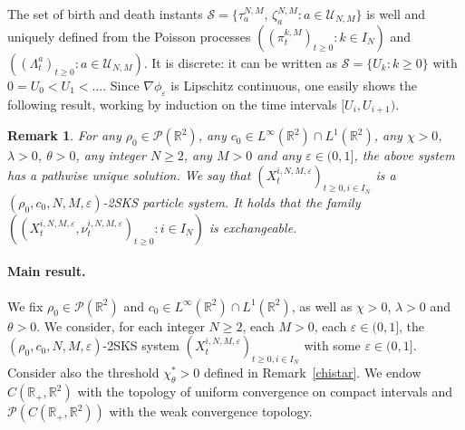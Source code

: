 \documentclass[11pt]{article}
\newtheorem{remark}[theorem]{Remark}
\newcommand{\R}{\mathbb{R}}
\newcommand{\1}{\mathbbm{1}}
\newcommand{\Ss}{\mathcal S}
\newcommand{\Pp}{\mathcal P}
\newcommand{\Uu}{\mathcal U}
\newcommand{\e}{\varepsilon}
\begin{document}
The set of birth and death instants $\Ss=\{\tau_a^{N,M}$, $\zeta_a^{N,M} : a \in \Uu_{N,M}\}$
is well and uniquely defined from the Poisson processes
$((\pi^{k,M}_t)_{t\geq 0} : k\in I_N)$ and $((\Lambda^a_t)_{t \geq 0}:a\in \Uu_{N,M})$. 
It is discrete: it can be written as $\Ss=\{U_k : k\geq 0\}$ with 
$0=U_0<U_1<\dots$. Since $\nabla \phi_\e$ is Lipschitz continuous, one easily
shows the following result, working by induction on the time intervals $[U_i,U_{i+1})$.

\begin{remark}\label{rkeu}
For any  $\rho_0 \in \Pp(\R^2)$, any $c_0 \in L^\infty(\R^2)\cap L^1(\R^2)$, any $\chi>0$, $\lambda>0$, 
$\theta>0$, any integer $N\geq 2$, any $M>0$ and any $\e\in (0,1]$,
the above system has a pathwise unique solution. We say that
$(X^{i,N,M,\e}_t)_{t\geq 0,i\in I_N}$ is a $(\rho_0,c_0,N,M,\e)$-2SKS particle system.
It holds that the family $((X^{i,N,M,\e}_t,\nu^{i,N,M,\e}_t)_{t\geq 0} : i \in I_N)$ is exchangeable.
\end{remark}


\paragraph{Main result.}

We fix $\rho_0 \in \Pp(\R^2)$ and $c_0 \in L^\infty(\R^2)\cap L^1(\R^2)$,
as well as $\chi>0$, $\lambda>0$ and $\theta>0$. We 
consider, for each integer $N\geq 2$, each $M>0$, each $\e\in (0,1]$, the  $(\rho_0,c_0,N,M,\e)$-2SKS system
$(X^{i,N,M,\e}_t)_{t\geq 0,i\in I_N}$ with some $\e\in (0,1]$. Consider also the threshold $\chi^*_\theta>0$ 
defined in Remark~\ref{chistar}.
We endow $C(\R_+,\R^2)$ with the topology of uniform convergence on compact intervals
and $\Pp(C(\R_+,\R^2))$ with the weak convergence topology.
\end{document}
